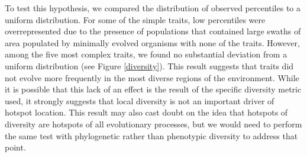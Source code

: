 To test this hypothesis, we compared the distribution of observed percentiles to a uniform distribution. For some of the simple traits, low percentiles were overrepresented due to the presence of populations that contained large swaths of area populated by minimally evolved organisms with none of the traits. However, among the five most complex traits, we found no substantial deviation from a uniform distribution (see Figure \ref{diversity}). This result suggests that traits did not evolve more frequently in the most diverse regions of the environment. While it is possible that this lack of an effect is the result of the specific diversity metric used, it strongly suggests that local diversity is not an important driver of hotspot location. This result may also cast doubt on the idea that hotspots of diversity are hotspots of all evolutionary processes, but we would need to perform the same test with phylogenetic rather than phenotypic diversity to address that point.





